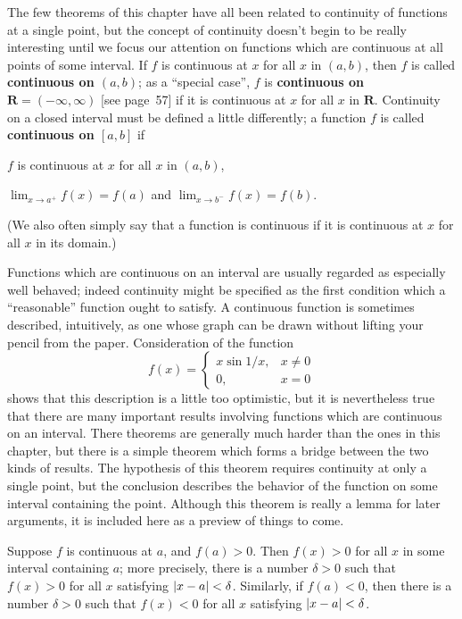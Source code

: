 The few theorems of this chapter have all been related to continuity of
functions at a single point, but the concept of continuity doesn't
begin to be really interesting until we focus our attention on functions
which are continuous at all points of some interval. If $f$ is
continuous at $x$ for all $x$ in $(a,b)$, then $f$ is called
\textbf{continuous on $(a,b)$}; as a ``special case'', $f$ is
\textbf{continuous on $\mathbf{R} = (-\infty,\infty)$} [see page~57] if
it is continuous at $x$ for all $x$ in $\mathbf{R}$. Continuity on a
closed interval must be defined a little differently; a function $f$ is
called \textbf{continuous on $[a,b]$} if
\begin{steps}
\item $f$ is continuous at $x$ for all $x$ in $(a,b)$,
\item $\lim_{x \to a^+} f(x) = f(a)$ and $\lim_{x \to b^-} f(x) = f(b)$.
\end{steps}
(We also often simply say that a function is continuous if it is
continuous at $x$ for all $x$ in its domain.)

Functions which are continuous on an interval are usually regarded as
especially well behaved; indeed continuity might be specified as the
first condition which a ``reasonable'' function ought to satisfy. A
continuous function is sometimes described, intuitively, as one whose
graph can be drawn without lifting your pencil from the paper.
Consideration of the function
\[
f(x) =
\begin{cases}
x \sin 1/x, & x \neq 0 \\
0,          & x = 0
\end{cases}
\]
shows that this description is a little too optimistic, but it is
nevertheless true that there are many important results involving
functions which are continuous on an interval. There theorems are
generally much harder than the ones in this chapter, but there is a
simple theorem which forms a bridge between the two kinds of results.
The hypothesis of this theorem requires continuity at only a single
point, but the conclusion describes the behavior of the function on some
interval containing the point. Although this theorem is really a lemma
for later arguments, it is included here as a preview of things to come.

\begin{theorem}
Suppose $f$ is continuous at $a$, and $f(a) > 0$. Then $f(x) > 0$ for
all $x$ in some interval containing $a$; more precisely, there is a
number $\delta > 0$ such that $f(x) > 0$ for all $x$ satisfying
$\lvert x - a\rvert < \delta$. Similarly, if $f(a) < 0$, then there is a
number $\delta > 0$ such that $f(x) < 0$ for all $x$ satisfying
$\lvert x - a\rvert < \delta$.
\end{theorem}


